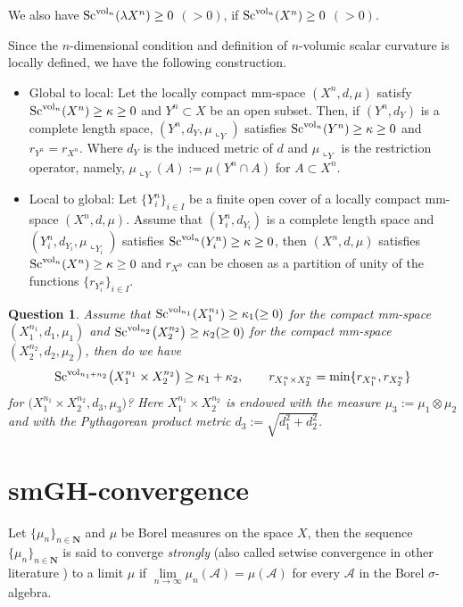 \documentclass[10pt,a4paper]{amsart}
\newtheorem{Question}[Theorem]{Question}
\begin{document}
We also have ${\rm Sc}^{{\rm vol}_n}(\lambda X^n)\geq 0$ $(>0)$, if ${\rm Sc}^{{\rm vol}_n}(X^n)\geq 0$ $(>0)$.

\begin{Remark}Since the $n$-dimensional condition and definition of $n$-volumic scalar curvature is locally defined, we have the following construction.
\begin{itemize}\itemsep=0pt
\item Global to local: Let the locally compact mm-space $(X^n, d, \mu)$ satisfy ${\rm Sc}^{{\rm vol}_n}(X^n)\geq \kappa\geq 0$ and $Y^n\subset X$ be an open subset. Then, if $(Y^n,d_Y)$ is a complete length space, $(Y^n,d_Y,\mu\llcorner_Y)$ satisfies ${\rm Sc}^{{\rm vol}_n}(Y^n)\geq \kappa\geq 0$ and $r_{Y^n}=r_{X^n}$. Where $d_Y$ is the induced metric of $d$ and $\mu\llcorner_Y$ is the restriction operator, namely, $\mu\llcorner_Y(A):=\mu(Y^n\cap A)$ for $A\subset X^n$.

\item Local to global: Let $\{Y^n_i\}_{i\in I}$ be a finite open cover of a locally compact mm-space $(X^n, d, \mu)$. Assume that $(Y^n_i,d_{Y_i})$ is a complete length space and $(Y^n_i,d_{Y_i},\mu\llcorner_{Y_i})$ satisfies ${\rm Sc}^{{\rm vol}_n}(Y^n_i)\geq \kappa\geq 0$, then $(X^n, d, \mu)$ satisfies ${\rm Sc}^{{\rm vol}_n}(X^n)\geq \kappa\geq 0$ and $r_{X^n}$ can be chosen as a partition of unity of the functions $\{r_{Y^n_i}\}_{i\in I}$.
\end{itemize}
\end{Remark}

\begin{Question}Assume that ${\rm Sc}^{{\rm vol}_{n_1}}(X^{n_1}_1)\geq \kappa_1 (\geq 0)$ for the compact mm-space $(X^{n_1}_1, d_1, \mu_1)$ and ${\rm Sc}^{{\rm vol}_{n_2}} \big(X^{n_2}_2 \big)\geq \kappa_2 (\geq 0)$ for the compact mm-space $(X^{n_2}_2, d_2, \mu_2)$, then do we have
 \begin{gather*}
 {\rm Sc}^{{\rm vol}_{n_1+n_2}} \big(X^{n_1}_1\times X^{n_2}_2 \big)\geq \kappa_1+\kappa_2, \qquad r_{X^n_1 \times X^n_2}=\min \{r_{X^n_1},r_{X^n_2}\}
 \end{gather*}
 for $ \big(X^{n_1}_1\times X^{n_2}_2, d_3, \mu_3 \big)$? Here $X^{n_1}_1 \times X^{n_2}_2$ is endowed with the measure $\mu_3:= \mu_1 \otimes \mu_2$ and with the Pythagorean product metric $d_3 :=\sqrt{d_1^2+d_2^2}$.
\end{Question}

\section{smGH-convergence}\label{sm}
 Let $\{\mu_n\}_{n\in\mathbf{N}}$ and $\mu$ be Borel measures on the space $X$, then the sequence $\{\mu_n\}_{n\in\mathbf{N}}$ is said to converge \textit{strongly} (also called setwise convergence in other literature ) to a limit $\mu$ if $\lim\limits_{n\rightarrow \infty} \mu_n(\mathcal{A})=\mu(\mathcal{A})$ for every $\mathcal{A}$ in the Borel $\sigma$-algebra.
\end{document}
